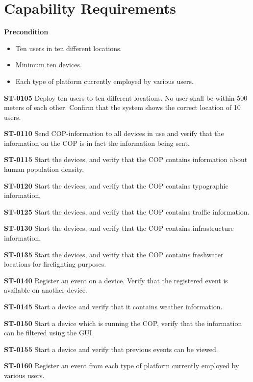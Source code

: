 \section{Capability Requirements}
\textbf{Precondition}
\begin{itemize}
\item Ten users in ten different locations.
\item Minimum ten devices. 
\item Each type of platform currently employed by various users. 
\end{itemize}


\begin{description}

\item\textbf{ST-0105} Deploy ten users to ten different locations. No user shall be within 500 meters of each other. Confirm that the system shows the correct location of 10 users. 
\item\textbf{ST-0110} Send COP-information to all devices in use and verify that the information on the COP is in fact the information being sent. 
\item\textbf{ST-0115} Start the devices, and verify that the COP contains information about human population density. 
\item\textbf{ST-0120} Start the devices, and verify that the COP contains typographic information. 
\item\textbf{ST-0125} Start the devices, and verify that the COP contains traffic information. 
\item\textbf{ST-0130} Start the devices, and verify that the COP contains infrastructure information. 
\item\textbf{ST-0135} Start the devices, and verify that the COP contains freshwater locations for firefighting purposes. 
\item\textbf{ST-0140} Register an event on a device. Verify that the registered event is available on another device. 
\item\textbf{ST-0145} Start a device and verify that it contains weather information. 
\item\textbf{ST-0150} Start a device which is running the COP, verify that the information can be filtered using the GUI. 
\item\textbf{ST-0155} Start a device and verify that previous events can be viewed. 
\item\textbf{ST-0160} Register an event from each type of platform currently employed by various users. 

\end{description}

